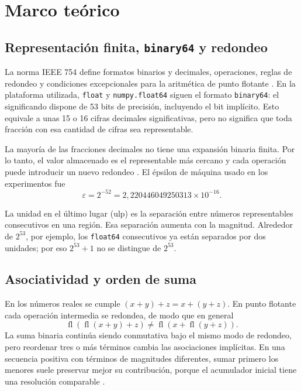 \documentclass[11pt,a4paper]{article}
\newcommand{\codigo}[1]{\texttt{#1}}
\begin{document}
\section{Marco teórico}

\subsection{Representación finita, \codigo{binary64} y redondeo}

La norma IEEE 754 define formatos binarios y decimales, operaciones, reglas de redondeo y condiciones excepcionales para la aritmética de punto flotante \citep{ieee2019}. En la plataforma utilizada, \codigo{float} y \codigo{numpy.float64} siguen el formato \codigo{binary64}: el significando dispone de 53 bits de precisión, incluyendo el bit implícito. Esto equivale a unas 15 o 16 cifras decimales significativas, pero no significa que toda fracción con esa cantidad de cifras sea representable.

La mayoría de las fracciones decimales no tiene una expansión binaria finita. Por lo tanto, el valor almacenado es el representable más cercano y cada operación puede introducir un nuevo redondeo \citep{goldberg1991,pythonfloat2026}. El épsilon de máquina usado en los experimentos fue
\begin{equation}
\varepsilon=2^{-52}=2{,}220446049250313\times10^{-16}.
\label{eq:epsilon}
\end{equation}

La unidad en el último lugar (ulp) es la separación entre números representables consecutivos en una región. Esa separación aumenta con la magnitud. Alrededor de $2^{53}$, por ejemplo, los \codigo{float64} consecutivos ya están separados por dos unidades; por eso $2^{53}+1$ no se distingue de $2^{53}$.

\subsection{Asociatividad y orden de suma}

En los números reales se cumple $(x+y)+z=x+(y+z)$. En punto flotante cada operación intermedia se redondea, de modo que en general
\begin{equation}
\operatorname{fl}\!\left(\operatorname{fl}(x+y)+z\right)
\ne
\operatorname{fl}\!\left(x+\operatorname{fl}(y+z)\right).
\label{eq:noasoc}
\end{equation}
La suma binaria continúa siendo conmutativa bajo el mismo modo de redondeo, pero reordenar tres o más términos cambia las asociaciones implícitas. En una secuencia positiva con términos de magnitudes diferentes, sumar primero los menores suele preservar mejor su contribución, porque el acumulador inicial tiene una resolución comparable \citep{higham2002}.
\end{document}
